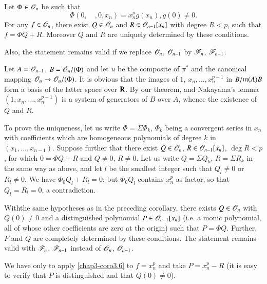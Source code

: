 \setcounter{theorem}{5}
\begin{corollary}\label{chap3-coro3.6}
Let $\Phi\in \mathscr{O}_{n}$ be such that 
$$
\Phi(0,\quad,0,x_{n})=x^{p}_{n}g(x_{n}), g(0)\neq 0.
$$ 
For any $f\in \mathscr{O}_{n}$, there exist $Q\in \mathscr{O}_{n}$ and $R\in \mathscr{O}_{n-1}[x_{n}]$ with degree $R<p$, such that $f=\Phi Q+R$. Moreover $Q$ and $R$ are uniquely determined by these conditions.

Also, the statement remains valid if we replace $\mathscr{O}_{n}$, $\mathscr{O}_{n-1}$ by $\mathscr{F}_{n}$, $\mathscr{F}_{n-1}$.
\end{corollary}

Let $A=\mathscr{O}_{n-1}$, $B=\mathscr{O}_{n}/(\Phi)$ and let $u$ be the composite of $\pi^{*}$ and the canonical mapping $\mathscr{O}_{n}\to \mathscr{O}_{n}/(\Phi)$. It is obvious that the images of $1$, $x_{n},\ldots,x^{p-1}_{n}$ in $B/\mathfrak{m}(A)B$ form a basis of the latter space over $\mathbf{R}$. By our theorem, and Nakayama's lemma $(1,x_{n},\ldots,x^{p-1}_{n})$ is a system of generators of $B$ over $A$, whence the existence of $Q$ and $R$.

To prove the uniqueness, let us write $\Phi=\Sigma \Phi_{k}$, $\Phi_{k}$ being a convergent series in $x_{n}$ with coefficients which are homogeneous polynomials of degree $k$ in $(x_{1},\ldots,x_{n-1})$. Suppose further that there exist $Q\in \mathscr{O}_{n}$, $R\in \mathscr{O}_{n-1}[x_{n}]$, $\deg R<p$, for which $0=\Phi Q+R$ and $Q\neq 0$, $R\neq 0$. Let us write $Q=\Sigma Q_{k}$, $R=\Sigma R_{k}$ in the same way as above, and let $l$ be the smallest integer such that $Q_{l}\neq 0$ or $R_{l}\neq 0$. We have $\Phi_{0}Q_{l}+R_{l}=0$; but $\Phi_{0}Q_{l}$ contains $x^{p}_{n}$ as factor, so that $Q_{l}=R_{l}=0$, a contradiction.

\begin{corollary}[Weierstrass]\label{chap3-coro3.7}
With\pageoriginale the same hypotheses as in the preceding corollary, there exists $Q\in \mathscr{O}_{n}$ with $Q(0)\neq 0$ and a distinguished polynomial $P\in \mathscr{O}_{n-1}[x_{n}]$ (i.e. a monic polynomial, all of whose other coefficients are zero at the origin) such that $P=\Phi Q$. Further, $P$ and $Q$ are completely determined by these conditions. The statement remains valid with $\mathscr{F}_{n}$, $\mathscr{F}_{n-1}$ instead of $\mathscr{O}_{n}$, $\mathscr{O}_{n-1}$.
\end{corollary}

We have only to apply \eqref{chap3-coro3.6} to $f=x^{p}_{n}$ and take $P=x^{p}_{n}-R$ (it is easy to verify that $P$ is distinguished and that $Q(0)\neq 0$).


